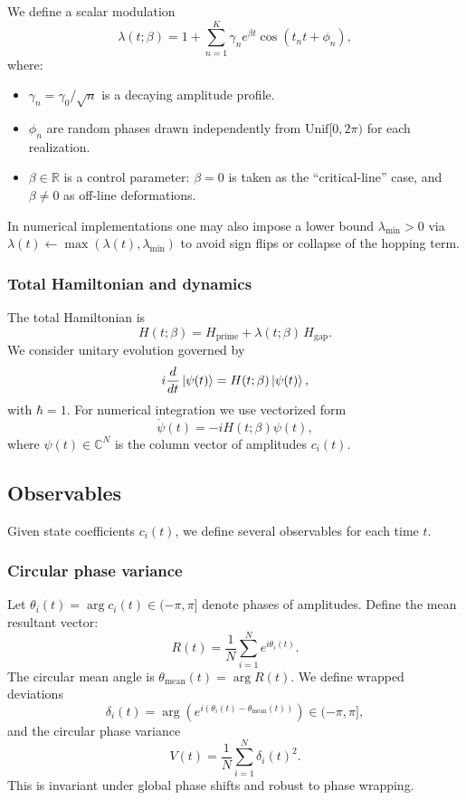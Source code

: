 \documentclass[11pt]{article}
\begin{document}
We define a scalar modulation
\begin{equation}
  \lambda(t;\beta) = 1 + \sum_{n=1}^K \gamma_n e^{\beta t}\cos(t_n t + \phi_n),
\end{equation}
where:
\begin{itemize}
  \item $\gamma_n = \gamma_0/\sqrt{n}$ is a decaying amplitude profile.
  \item $\phi_n$ are random phases drawn independently from $\mathrm{Unif}[0,2\pi)$ for each realization.
  \item $\beta\in\mathbb{R}$ is a control parameter: $\beta=0$ is taken as the ``critical-line'' case, and $\beta\neq 0$ as off-line deformations.
\end{itemize}
In numerical implementations one may also impose a lower bound $\lambda_{\min}>0$ via $\lambda(t)\gets\max(\lambda(t),\lambda_{\min})$ to avoid sign flips or collapse of the hopping term.

\subsubsection{Total Hamiltonian and dynamics}

The total Hamiltonian is
\begin{equation}
  H(t;\beta) = H_{\mathrm{prime}} + \lambda(t;\beta)\,H_{\mathrm{gap}}.
\end{equation}
We consider unitary evolution governed by
\begin{equation}
  i\frac{d}{dt}\ket{\psi(t)} = H(t;\beta)\ket{\psi(t)},
\end{equation}
with $\hbar=1$. For numerical integration we use vectorized form
\[
\dot{\psi}(t) = -i H(t;\beta)\psi(t),
\]
where $\psi(t)\in\mathbb{C}^N$ is the column vector of amplitudes $c_i(t)$.

\subsection{Observables}

Given state coefficients $c_i(t)$, we define several observables for each time $t$.

\subsubsection{Circular phase variance}

Let $\theta_i(t) = \arg c_i(t)\in(-\pi,\pi]$ denote phases of amplitudes. Define the mean resultant vector:
\begin{equation}
  R(t) = \frac{1}{N}\sum_{i=1}^N e^{i\theta_i(t)}.
\end{equation}
The circular mean angle is $\theta_{\mathrm{mean}}(t) = \arg R(t)$. We define wrapped deviations
\begin{equation}
  \delta_i(t) = \arg\left(e^{i(\theta_i(t)-\theta_{\mathrm{mean}}(t))}\right)\in(-\pi,\pi],
\end{equation}
and the circular phase variance
\begin{equation}
  V(t) = \frac{1}{N}\sum_{i=1}^N \delta_i(t)^2.
\end{equation}
This is invariant under global phase shifts and robust to phase wrapping.
\end{document}
